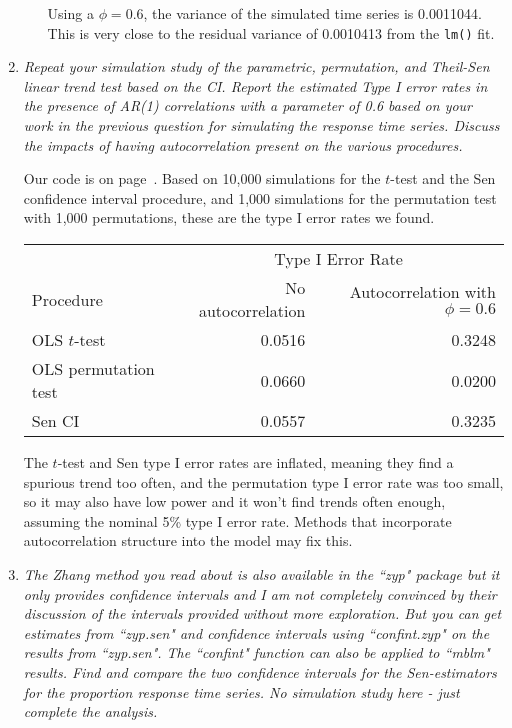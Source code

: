 \documentclass[11pt]{article}\usepackage[]{graphicx}\usepackage[]{color}
\begin{document}
\begin{enumerate}
\begin{enumerate}
Using a $\phi=0.6$, the variance of the simulated time series is 0.0011044. This is very close to the residual variance of 0.0010413 from the \texttt{lm()} fit.

\end{enumerate}

\item%
{\it Repeat your simulation study of the parametric, permutation, and Theil-Sen linear trend test based on the CI. Report the estimated Type I error rates in the presence of AR(1) correlations with a parameter of 0.6 based on your work in the previous question for simulating the response time series. Discuss the impacts of having autocorrelation present on the various procedures.}



Our code is on page~\pageref{eightcode}. Based on 10,000 simulations for the $t$-test and the Sen confidence interval procedure, and 1,000 simulations for the permutation test with 1,000 permutations, these are the type I error rates we found.

\begin{center}\begin{tabular}{lrr}
 & \multicolumn{2}{c}{Type I Error Rate} \\
Procedure & No autocorrelation & Autocorrelation with $\phi=0.6$ \\
\hline
OLS $t$-test & 0.0516 & 0.3248 \\
OLS permutation test & 0.0660 & 0.0200 \\
Sen CI & 0.0557 & 0.3235
\end{tabular}\end{center}

The $t$-test and Sen type I error rates are inflated, meaning they find a spurious trend too often, and the permutation type I error rate was too small, so it may also have low power and it won't find trends often enough, assuming the nominal 5\% type I error rate. Methods that incorporate autocorrelation structure into the model may fix this.

\pagebreak
\item%
{\it The Zhang method you read about is also available in the ``zyp" package but it only provides confidence intervals and I am not completely convinced by their discussion of the intervals provided without more exploration. But you can get estimates from ``zyp.sen" and confidence intervals using ``confint.zyp" on the results from ``zyp.sen". The ``confint" function can also be applied to ``mblm" results. Find and compare the two confidence intervals for the Sen-estimators for the proportion response time series. No simulation study here - just complete the analysis.}






\end{enumerate}
\end{document}
